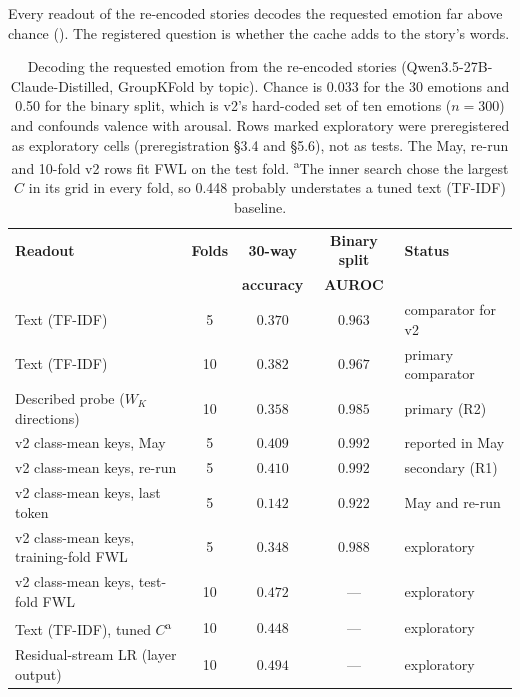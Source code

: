 \documentclass[11pt,a4paper]{article}
\begin{document}
Every readout of the re-encoded stories decodes the requested emotion far above chance (). The registered question is whether the cache adds to the story's words.

\begin{table}[H]
\centering
\caption{Decoding the requested emotion from the re-encoded stories (Qwen3.5-27B-Claude-Distilled, GroupKFold by topic). Chance is 0.033 for the 30 emotions and 0.50 for the binary split, which is v2's hard-coded set of ten emotions ($n = 300$) and confounds valence with arousal. Rows marked exploratory were preregistered as exploratory cells (preregistration \S3.4 and \S5.6), not as tests. The May, re-run and 10-fold v2 rows fit FWL on the test fold. \textsuperscript{a}The inner search chose the largest $C$ in its grid in every fold, so 0.448 probably understates a tuned text (TF-IDF) baseline.}
\label{tab:wk_probe}
\small
\begin{tabular}{lcccl}
\toprule
\textbf{Readout} & \textbf{Folds} & \textbf{30-way} & \textbf{Binary split} & \textbf{Status} \\
 & & \textbf{accuracy} & \textbf{AUROC} & \\
\midrule
Text (TF-IDF) & 5 & $0.370$ & $0.963$ & comparator for v2 \\
Text (TF-IDF) & 10 & $0.382$ & $0.967$ & primary comparator \\
Described probe ($W_K$ directions) & 10 & $0.358$ & $0.985$ & primary (R2) \\
v2 class-mean keys, May & 5 & $0.409$ & $0.992$ & reported in May \\
v2 class-mean keys, re-run & 5 & $0.410$ & $0.992$ & secondary (R1) \\
v2 class-mean keys, last token & 5 & $0.142$ & $0.922$ & May and re-run \\
\midrule
v2 class-mean keys, training-fold FWL & 5 & $0.348$ & $0.988$ & exploratory \\
v2 class-mean keys, test-fold FWL & 10 & $0.472$ & --- & exploratory \\
Text (TF-IDF), tuned $C$\textsuperscript{a} & 10 & $0.448$ & --- & exploratory \\
Residual-stream LR (layer output) & 10 & $0.494$ & --- & exploratory \\
\bottomrule
\end{tabular}
\end{table}
\end{document}
